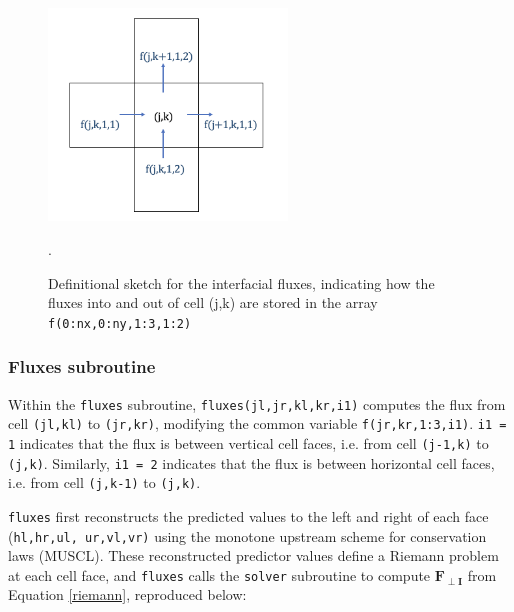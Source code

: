 \documentclass{article}
\newcommand{\code}[1]{\texttt{#1}}
\begin{document}
 \begin{figure}[h]
 \centering
\includegraphics[width=15pc]{grid/fluxes_specific.png}
 \caption{Definitional sketch for the interfacial fluxes, indicating how the fluxes into and out of cell (j,k) are stored in the array \code{f(0:nx,0:ny,1:3,1:2)}}.
 \label{fluxes_specific.png}
 \end{figure}

\subsubsection*{Fluxes subroutine}

Within the \code{fluxes} subroutine, \code{fluxes(jl,jr,kl,kr,i1)} computes the flux from cell \code{(jl,kl)} to \code{(jr,kr)}, modifying the common variable \code{f(jr,kr,1:3,i1)}. 
\code{i1 = 1} indicates that the flux is between vertical cell faces, i.e. from cell \code{(j-1,k)} to \code{(j,k)}.
Similarly, \code{i1 = 2} indicates that the flux is between horizontal cell faces, i.e. from cell \code{(j,k-1)} to \code{(j,k)}.

 
\code{fluxes}  first reconstructs the predicted values to the left and right of each face (\code{hl,hr,ul, ur,vl,vr)} using the monotone upstream scheme for conservation laws (MUSCL).  These reconstructed predictor values define a Riemann problem at each cell face, and \code{fluxes} calls the \code{solver} subroutine to compute $\mathbf{F_{\perp I}}$ from Equation \ref{riemann}, reproduced below:
\end{document}
